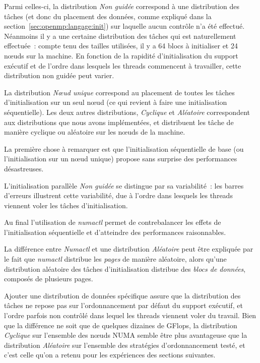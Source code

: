 Parmi celles-ci, la distribution \emph{Non guidée} correspond à une distribution des tâches (et donc du placement des données, comme expliqué dans la section~\ref{sec:openmp:langage:init}) sur laquelle aucun contrôle n'a été effectué.
Néanmoins il y a une certaine distribution des tâches qui est naturellement effectuée~: compte tenu des tailles utilisées, il y a 64 blocs à initialiser et 24 nœuds sur la machine. En fonction de la rapidité d'initialisation du support exécutif et de l'ordre dans lesquels les threads commencent à travailler, cette distribution non guidée peut varier.

La distribution \emph{Nœud unique} correspond au placement de toutes les tâches d'initialisation sur un seul nœud (ce qui revient à faire une initialisation séquentielle).
Les deux autres distributions, \emph{Cyclique} et \emph{Aléatoire} correspondent aux distributions que nous avons implémentées, et distribuent les tâche de manière cyclique ou aléatoire sur les nœuds de la machine.

La première chose à remarquer est que l'initialisation séquentielle de base (ou l'initialisation sur un nœud unique) propose sans surprise des performances désastreuses.

L'initialisation parallèle \emph{Non guidée} se distingue par sa variabilité~: les barres d'erreurs illustrent cette variabilité, due à l'ordre dans lesquels les threads viennent voler les tâches d'initialisation.

Au final l'utilisation de \emph{numactl} permet de contrebalancer les effets de l'initialisation séquentielle et d'atteindre des performances raisonnables.

La différence entre \emph{Numactl} et une distribution \emph{Aléatoire} peut être expliquée par le fait que \emph{numactl} distribue les \emph{pages} de manière aléatoire, alors qu'une distribution aléatoire des tâches d'initialisation distribue des \emph{blocs de données}, composés de plusieurs pages.

Ajouter une distribution de données spécifique assure que la distribution des tâches ne repose pas sur l'ordonnancement par défaut du support exécutif, et l'ordre parfois non contrôlé dans lequel les threads viennent voler du travail.
Bien que la différence ne soit que de quelques dizaines de GFlops, la distribution \emph{Cyclique} sur l'ensemble des nœuds NUMA semble être plus avantageuse que la distribution \emph{Aléatoire} sur l'ensemble des stratégies d'ordonnancement testé, et c'est celle qu'on a retenu pour les expériences des sections suivantes.


